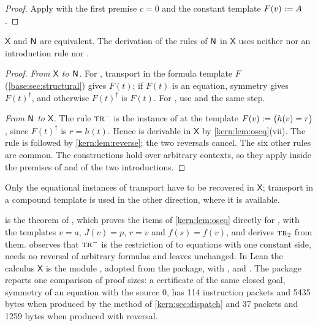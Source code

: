 \begin{proof}
Apply  with the first premise $c=0$ and the constant template
$F(v)\mathrel{:=} A$.
\end{proof}

\begin{theorem}
\label{kern:thm:reversal}
$\mathsf{X}$ and $\mathsf{N}$ are equivalent.  The derivation of the rules of $\mathsf{N}$
in $\mathsf{X}$ uses neither  nor an introduction rule nor
.
\end{theorem}

\begin{proof}
\emph{From $\mathsf{X}$ to $\mathsf{N}$.}  For , transport in the
formula template $F$ (\cref{base:sec:structural}) gives $F(t)$; if $F(t)$ is
an equation, symmetry gives $F(t)^{\dagger}$, and otherwise
$F(t)^{\dagger}$ is $F(t)$.  For , use  and the
same step.

\emph{From $\mathsf{N}$ to $\mathsf{X}$.}  The rule $\rulename{Tr}^{-}$ is the
instance of  at the template $F(v)\mathrel{:=}\bigl(h(v)=r\bigr)$,
since $F(t)^{\dagger}$ is $r=h(t)$.  Hence  is derivable in
$\mathsf{X}$ by \cref{kern:lem:oseq}(vii).  The rule  is
 followed by \cref{kern:lem:reverse}; the two reversals cancel.
The six other rules are common.  The constructions hold over arbitrary
contexts, so they apply inside the premises of  and of the two
introductions.
\end{proof}

Only the equational instances of transport have to be recovered in
$\mathsf{X}$; transport in a compound template is used in the other
direction, where it is available.

\begin{remark}[Sources]
\label{kern:rem:reversal-sources}
 is the theorem of , which proves
the items of \cref{kern:lem:oseq} directly for , with the
templates $v=a$, $J(v)=p$, $r=v$ and $f(s)=f(v)$, and derives
$\rulename{Tr}_{2}$ from them.   observes that
$\rulename{Tr}^{-}$ is the restriction of  to equations with
one constant side, needs no reversal of arbitrary formulas and leaves
 unchanged.  In Lean the calculus $\mathsf{X}$ is the module
, adopted from the package, with
,  and
.  The package reports one comparison of proof
sizes: a certificate of the same closed goal, symmetry of an equation with
the source $0$, has 114 instruction packets and 5435 bytes when produced by
the method of \cref{kern:sec:dispatch} and 37 packets and 1259 bytes when
produced with reversal.
\end{remark}

